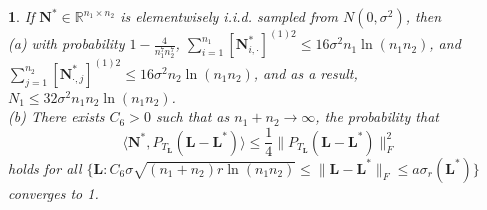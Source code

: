 \documentclass[12pt]{article}
\newcommand{\bL}{\boldsymbol{L}}
\def\reals{\mathbb{R}}
\def\bY{\boldsymbol{Y}}
\def\bN{\boldsymbol{N}}
\theoremstyle{plain}
\newtheorem{lem}{\protect\lemmaname}
\theoremstyle{definition}
\theoremstyle{plain}
\theoremstyle{plain}
\theoremstyle{remark}
\providecommand{\lemmaname}{Lemma}
\begin{document}
\begin{lem}\label{lemma:prob}
If $\bN^*\in\reals^{n_1\times n_2}$ is elementwisely i.i.d. sampled from $N(0,\sigma^2)$, then\\
(a) with probability $1-\frac{4}{n_1^7n_2^7}$, $\sum_{i=1}^{n_1}[\bN^*_{i,\cdot}]^{(1)2}\leq 16\sigma^2 n_1\ln (n_1n_2)$, and $\sum_{j=1}^{n_2}[\bN^*_{\cdot,j}]^{(1)2}\leq 16\sigma^2 n_2\ln (n_1n_2)$, and as a result, $N_1\leq 32\sigma^2n_1n_2\ln (n_1n_2)$.\\
(b) There exists $C_6>0$ such that as $n_1+n_2\rightarrow\infty$, the probability that
\begin{equation}\label{eq:event_noisy}\langle\bN^*, P_{T_{\bL}} (\bL-\bL^*)\rangle\leq \frac{1}{4}\|P_{T_{\bL}} (\bL-\bL^*)\|_F^2\end{equation} holds for all $\{\bL: C_6\sigma\sqrt{(n_1+n_2)r\ln(n_1n_2)}\leq \|\bL-\bL^*\|_F\leq a\sigma_r(\bL^*)\}$ converges to 1.
\end{lem}

\end{document}

